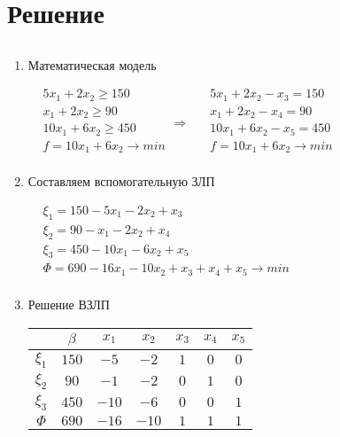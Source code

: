 \documentclass{article}
\begin{document}
\section*{Решение}
\subsection{}
\begin{enumerate}
\item Математическая модель
    
    $\begin{aligned}
        &5x_1 + 2x_2 \geqslant 150 \\
        &x_1 + 2x_2 \geqslant 90 \\
        &10x_1 + 6x_2 \geqslant 450 \\
        &f = 10x_1 + 6x_2 \rightarrow min\\
    \end{aligned} \Longrightarrow \ \ 
    \begin{aligned}
        &5x_1 + 2x_2 - x_3 = 150 \\
        &x_1 + 2x_2 - x_4 = 90 \\
        &10x_1 + 6x_2 - x_5 = 450 \\
        &f = 10x_1 + 6x_2 \rightarrow min\\
    \end{aligned}$
\item Составляем вспомогательную ЗЛП
    
    $\begin{aligned}
        &\xi_1 = 150 - 5x_1 - 2x_2 + x_3 \\
        &\xi_2 = 90 - x_1 - 2x_2 + x_4 \\
        &\xi_3 = 450 - 10x_1 - 6x_2 + x_5 \\
        &\Phi = 690 
        - 16x_1 - 10x_2 + x_3 + x_4 + x_5 \rightarrow min\\
    \end{aligned}$
\item Решение ВЗЛП
\begin{center}
        
    \begin{tabular}{ c | c | c | c | c | c | c}
        & $\beta$ & $x_1$ & $x_2$ & $x_3$ & $x_4$ & $x_5$\\
        \hline
        $\xi_1$ & $150$ & $\boxed{-5}$ & $-2$ & $1$  & $0$ & $0$ \\
        $\xi_2$ & $90$ & $-1$ & $-2$ & $0$ & $1$ & $0$ \\
        $\xi_3$ & $450$ & $-10$ & $-6$ & $0$ & $0$ & $1$ \\
        \hline
        $\Phi$   & $690$ & $-16$ & $-10$ & $1$ & $1$ & $1$ \\
    \end{tabular}


\end{center}
\end{enumerate}
\end{document}
